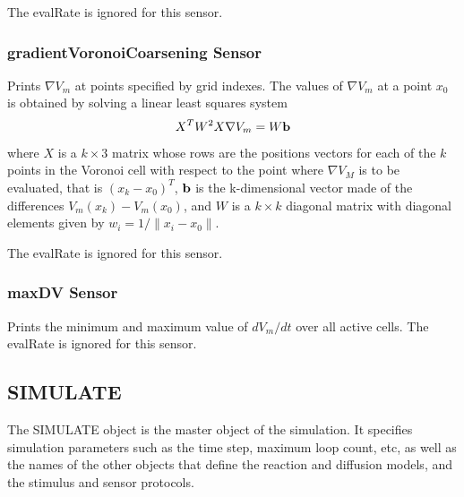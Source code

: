 \documentclass{article}
\begin{document}
The evalRate is ignored for this sensor.

\begin{keywords}
\end{keywords}

\subsubsection{gradientVoronoiCoarsening Sensor}
Prints $\nabla V_m$ at points specified by grid indexes. 
The values of $\nabla V_m$ at a point $x_0$ is
obtained by solving a linear least squares system
$$
X^TW^2 X \nabla V_m=W {\bf b}
$$
where $X$ is a $k\times 3$ matrix whose rows are the positions vectors 
for each of the $k$ points in the Voronoi cell with respect to the point where
$\nabla V_M$ is to be evaluated, that is $(x_k-x_0)^T$,
${\bf b}$ is the k-dimensional vector made of the differences $V_m(x_k)-V_m(x_0)$,
and $W$ is a $k\times k$ diagonal matrix with diagonal elements given by $w_i=1/\|x_i-x_0\|$.

The evalRate is ignored for this sensor.

\begin{keywords}
\end{keywords}

\subsubsection{maxDV Sensor}
Prints the minimum and maximum value of $dV_m/dt$ over all active cells.
The evalRate is ignored for this sensor.

\begin{keywords}
\end{keywords}

\subsection{SIMULATE}

The SIMULATE object is the master object of the simulation.  It
specifies simulation parameters such as the time step, maximum loop
count, etc, as well as the names of the other objects that define the
reaction and diffusion models, and the stimulus and sensor
protocols.
\end{document}

